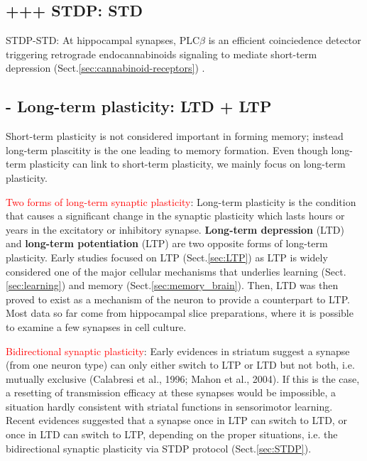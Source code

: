 \subsection{+++ STDP: STD}

STDP-STD: At hippocampal synapses, PLC$\beta$ is an efficient coinciedence
detector triggering retrograde endocannabinoids signaling to mediate short-term
depression (Sect.\ref{sec:cannabinoid-receptors}) \citep{hashimotodani2005}. 


\subsection{- Long-term plasticity: LTD + LTP}
\label{sec:LTplasticity}
\label{sec:mechanism-long-term-plasticity}
\label{sec:long-term_potentiation}
\label{sec:long-term_depression}
\label{sec:LTD}

Short-term plasticity is not considered important in forming memory; instead
long-term plascitity is the one leading to memory formation.
Even though long-term plasticity can link to short-term plasticity, we mainly
focus on long-term plasticity. 

\textcolor{red}{Two forms of long-term synaptic plasticity}: Long-term
plasticity is the condition that causes a significant change in the synaptic plasticity which lasts hours or years in the excitatory or inhibitory
synapse. {\bf Long-term depression} (LTD) and {\bf long-term potentiation} (LTP)
are two opposite forms of long-term plasticity.
Early studies focused on LTP (Sect.\ref{sec:LTP}) as LTP is widely considered
one of the major cellular mechanisms that underlies learning
(Sect.\ref{sec:learning}) and memory (Sect.\ref{sec:memory_brain}).
Then, LTD was then proved to exist as a mechanism of the neuron to provide a
counterpart to LTP. Most data so far come from hippocampal slice preparations,
where it is possible to examine a few synapses in cell culture.

\textcolor{red}{Bidirectional synaptic plasticity}: Early evidences in striatum
suggest a synapse (from one neuron type) can only either switch to LTP or LTD
but not both, i.e. mutually exclusive (Calabresi et al., 1996; Mahon et al.,
2004). If this is the case, a resetting of transmission efficacy at these
synapses would be impossible, a situation hardly consistent with striatal
functions in sensorimotor learning. Recent evidences suggested that a synapse
once in LTP can switch to LTD, or once in LTD can switch to LTP, depending on
the proper situations, i.e. the bidirectional synaptic plasticity via STDP
protocol (Sect.\ref{sec:STDP}).

